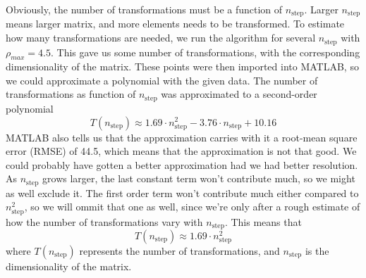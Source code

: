 Obviously, the number of transformations must be a function of $n_{\mathrm{step}}$. Larger
$n_{\mathrm{step}}$ means larger matrix, and more elements needs to be transformed.
To estimate how many transformations are needed, we run the algorithm for several
$n_{\mathrm{step}}$ with $\rho_{max} = 4.5$. This gave us some number of transformations,
with the corresponding dimensionality of the matrix. These points were then imported into 
MATLAB, so we could approximate a polynomial with the given data. The number of transformations as function of $n_{\mathrm{step}}$ was approximated to a second-order polynomial
%
$$ T(n_{\mathrm{step}}) \approx 1.69 \cdot n_{\mathrm{step}}^2 - 3.76 \cdot n_{\mathrm{step}}
+ 10.16 $$
%
MATLAB also tells us that the approximation carries with it a root-mean square error
(RMSE) of 44.5, which means that the approximation is not that good. We could probably
have gotten a better approximation had we had better resolution. 
As $n_{\mathrm{step}}$ grows larger, the last constant term won't contribute much, so we 
might as well exclude it. The first order term won't contribute much either compared to
$n_{\mathrm{step}}^2$, so we will ommit that one as well, since we're only after a rough 
estimate of how the number of transformations vary with $n_{\mathrm{step}}$. This means that
$$ T(n_{\mathrm{step}}) \approx 1.69 \cdot n_{\mathrm{step}}^2 $$
where $T(n_{\mathrm{step}})$ represents the number of transformations, and $n_{\mathrm{step}}$
is the dimensionality of the matrix.






